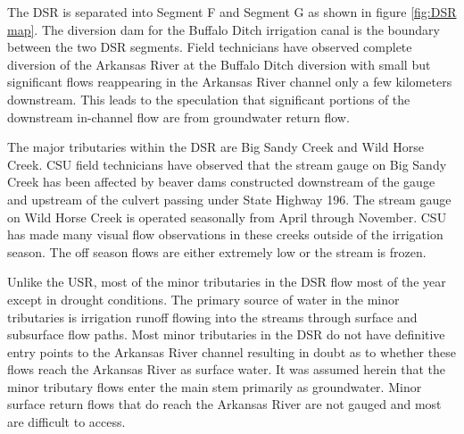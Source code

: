 \begin{linenumbers}[1]

The DSR is separated into Segment F and Segment G as shown in figure \ref{fig:DSR map}. The diversion dam for the Buffalo Ditch irrigation canal is the boundary between the two DSR segments.  Field technicians have observed complete diversion of the Arkansas River at the Buffalo Ditch diversion with small but significant flows reappearing in the Arkansas River channel only a few kilometers downstream.  This leads to the speculation that significant portions of the downstream in-channel flow are from groundwater return flow.

The major tributaries within the DSR are Big Sandy Creek and Wild Horse Creek.  CSU field technicians have observed that the stream gauge on Big Sandy Creek has been affected by beaver dams constructed downstream of the gauge and upstream of the culvert passing under State Highway 196.  The stream gauge on Wild Horse Creek is operated seasonally from April through November.  CSU has made many visual flow observations in these creeks outside of the irrigation season.  The off season flows are either extremely low or the stream is frozen.

Unlike the USR, most of the minor tributaries in the DSR flow most of the year except in drought conditions.  The primary source of water in the minor tributaries is irrigation runoff flowing into the streams through surface and subsurface flow paths.  Most minor tributaries in the DSR do not have definitive entry points to the Arkansas River channel resulting in doubt as to whether these flows reach the Arkansas River as surface water.  It was assumed herein that the minor tributary flows enter the main stem primarily as groundwater.  Minor surface return flows that do reach the Arkansas River are not gauged and most are difficult to access. 


\end{linenumbers}
